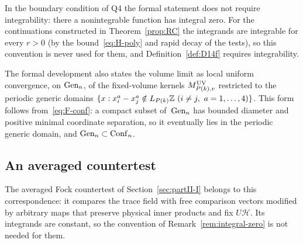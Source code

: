 \begin{remark}\label{rem:integral-zero}
In the boundary condition of Q4 the formal statement does not require integrability: there a nonintegrable function has integral zero. For the continuations constructed in Theorem~\ref{prop:RC} the integrands are integrable for every $r>0$ (by the bound~\eqref{eq:H-poly} and rapid decay of the tests), so this convention is never used for them, and Definition~\ref{def:D14f} requires integrability.
\end{remark}

The formal development also states the volume limit as local uniform convergence, on $\mathrm{Gen}_{n}$, of the fixed-volume kernels $M^{\rm UV}_{P(k),v}$ restricted to the periodic generic domains $\{x:x_i^a-x_j^a\notin L_{P(k)}\Z\ (i\ne j,\ a=1,\ldots,4)\}$. This form follows from~\eqref{eq:F-conf}: a compact subset of~$\mathrm{Gen}_{n}$ has bounded diameter and positive minimal coordinate separation, so it eventually lies in the periodic generic domain, and $\mathrm{Gen}_{n}\subset\mathrm{Conf}_{n}$.

\subsection{An averaged countertest}\label{sec:averaged-countertest}

The averaged Fock countertest of Section~\ref{sec:partII-I} belongs to this correspondence: it compares the trace field with free comparison vectors modified by arbitrary maps that preserve physical inner products and fix $U\mathcal H$. Its integrands are constant, so the convention of Remark~\ref{rem:integral-zero} is not needed for them.

